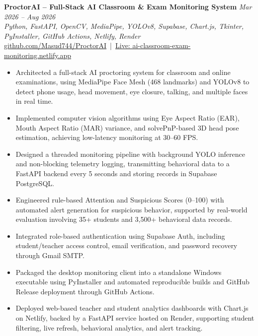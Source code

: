 \documentclass[11pt,a4paper]{article}
\begin{document}
\textbf{ProctorAI -- Full-Stack AI Classroom \& Exam Monitoring System} \hfill \textit{Mar 2026 -- Aug 2026} \\
\textit{Python, FastAPI, OpenCV, MediaPipe, YOLOv8, Supabase, Chart.js, Tkinter, PyInstaller, GitHub Actions, Netlify, Render} \\
\href{https://github.com/Masud744/ProctorAI}{github.com/Masud744/ProctorAI} \,|\, \href{https://ai-classroom-exam-monitoring.netlify.app}{Live: ai-classroom-exam-monitoring.netlify.app}
\begin{itemize}
    \item Architected a full-stack AI proctoring system for classroom and online examinations, using MediaPipe Face Mesh (468 landmarks) and YOLOv8 to detect phone usage, head movement, eye closure, talking, and multiple faces in real time.
    \item Implemented computer vision algorithms using Eye Aspect Ratio (EAR), Mouth Aspect Ratio (MAR) variance, and solvePnP-based 3D head pose estimation, achieving low-latency monitoring at 30--60 FPS.
    \item Designed a threaded monitoring pipeline with background YOLO inference and non-blocking telemetry logging, transmitting behavioral data to a FastAPI backend every 5 seconds and storing records in Supabase PostgreSQL.
    \item Engineered rule-based Attention and Suspicious Scores (0--100) with automated alert generation for suspicious behavior, supported by real-world evaluation involving 35+ students and 3,500+ behavioral data records.
    \item Integrated role-based authentication using Supabase Auth, including student/teacher access control, email verification, and password recovery through Gmail SMTP.
    \item Packaged the desktop monitoring client into a standalone Windows executable using PyInstaller and automated reproducible builds and GitHub Release deployment through GitHub Actions.
    \item Deployed web-based teacher and student analytics dashboards with Chart.js on Netlify, backed by a FastAPI service hosted on Render, supporting student filtering, live refresh, behavioral analytics, and alert tracking.
\end{itemize}
\end{document}
